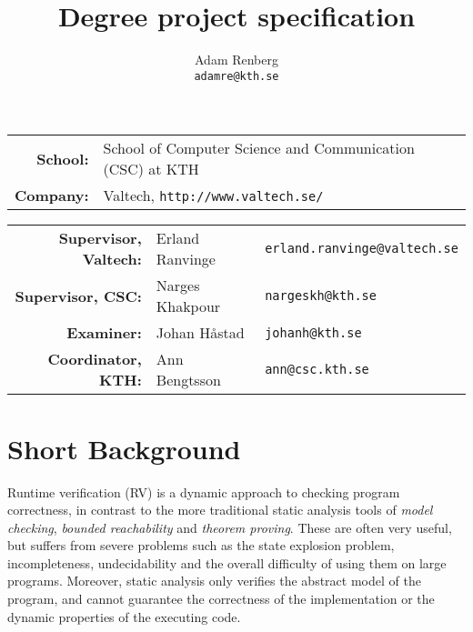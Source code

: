 \documentclass[a4paper,11pt]{article}
\begin{document}
\setlength\parindent{0em}
\setlength\parskip{1em}


\title{Degree project specification}
\author{Adam Renberg\\\texttt{adamre@kth.se}}

\maketitle

\begin{tabular}{rll}
	\textbf{School:}  & School of Computer Science and Communication (CSC) at KTH \\
    \textbf{Company:} & Valtech, \texttt{http://www.valtech.se/} \\
\end{tabular}

\begin{tabular}{rll}
	\textbf{Supervisor, Valtech:} & Erland Ranvinge & \texttt{erland.ranvinge@valtech.se} \\
    \textbf{Supervisor, CSC:}     & Narges Khakpour & \texttt{nargeskh@kth.se} \\
    \textbf{Examiner:}		  & Johan Håstad	& \texttt{johanh@kth.se} \\
    \textbf{Coordinator, KTH:}	  & Ann Bengtsson & \texttt{ann@csc.kth.se} \\
\end{tabular}


\begin{spacing}{0.9}
\setlength\parskip{0.1em}
\tableofcontents
\end{spacing}

\section{Short Background}

Runtime verification (RV) is a dynamic approach to checking program correctness, in contrast to the more 
traditional static analysis tools of \emph{model checking}, \emph{bounded reachability} and \emph{theorem proving}. These are often very useful, but suffers from severe problems such as the
state explosion problem, incompleteness, undecidability and the overall difficulty of using them
on large programs. Moreover, static analysis only verifies the abstract model of the program, and cannot guarantee the correctness of the implementation or the dynamic properties of the executing code.
\end{document}
